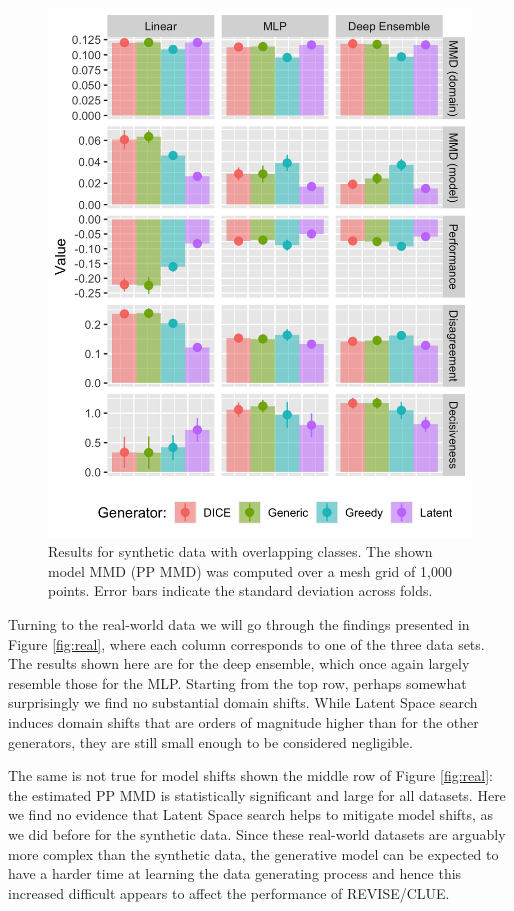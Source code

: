 \documentclass[conference,final,]{IEEEtran}
\theoremstyle{definition}
\theoremstyle{definition}
\theoremstyle{definition}
\theoremstyle{definition}
\theoremstyle{remark}
\begin{document}
\begin{figure}

{\centering \includegraphics[width=0.9\linewidth]{www/synthetic_results} 

}

\caption{Results for synthetic data with overlapping classes. The shown model MMD (PP MMD) was computed over a mesh grid of 1,000 points. Error bars indicate the standard deviation across folds.}\label{fig:syn}
\end{figure}

Turning to the real-world data we will go through the findings presented in Figure \ref{fig:real}, where each column corresponds to one of the three data sets. The results shown here are for the deep ensemble, which once again largely resemble those for the MLP. Starting from the top row, perhaps somewhat surprisingly we find no substantial domain shifts. While Latent Space search induces domain shifts that are orders of magnitude higher than for the other generators, they are still small enough to be considered negligible.

The same is not true for model shifts shown the middle row of Figure \ref{fig:real}: the estimated PP MMD is statistically significant and large for all datasets. Here we find no evidence that Latent Space search helps to mitigate model shifts, as we did before for the synthetic data. Since these real-world datasets are arguably more complex than the synthetic data, the generative model can be expected to have a harder time at learning the data generating process and hence this increased difficult appears to affect the performance of REVISE/CLUE.
\end{document}
